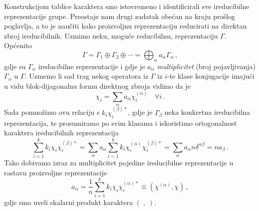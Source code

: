 Konstrukcijom tablice karaktera smo istovremeno i identificirali sve ireducibilne
reprezentacije grupe. Preostaje nam drugi zadatak obećan na kraju prošlog poglavlja,
a to je naučiti kako proizvoljnu reprezentaciju reducirati na direktan zbroj
ireducibilnih.  Uzmimo neku, moguće reducibilnu, reprezentaciju $\Gamma$. Općenito
\begin{displaymath}
  \Gamma = \Gamma_{1}\oplus\Gamma_{2}\oplus\cdots =
  \bigoplus_{\alpha} a_{\alpha} \Gamma_{\alpha} \,,
\end{displaymath}
gdje su $\Gamma_{\alpha}$ ireducibilne reprezentacije i
gdje je $a_{\alpha}$ \emph{multiplicitet} (broj pojavljivanja) 
$\Gamma_{\alpha}$ u $\Gamma$. 
Uzmemo li sad trag nekog operatora iz $\Gamma$ iz  $i$-te klase konjugacije
imajući u vidu blok-dijagonalnu formu direktnog zbroja vidimo da je
\begin{equation}
  \chi_i = \sum_{\alpha}  a_{\alpha} \chi^{(\alpha)}_i \quad 
  \forall i  \,.
\end{equation}
Sada pomnožimo ovu relaciju s $k_i \chi^{(\beta)*}_i$, gdje je $\Gamma_{\beta}$
neka konkretna ireducibilna reprezentacija, te prosumiramo po svim klasama
i iskoristimo ortogonalnost karaktera ireducibilnih reprezentacija
\begin{equation}
\sum_{i=1}^{k} k_i \chi_i \chi^{(\beta)*}_i =
\sum_{\alpha}  a_{\alpha} \sum_{i=1}^{k} k_i\chi^{(\alpha)}_i \chi^{(\beta)*}_i
=\sum_{\alpha}  a_{\alpha} n \delta^{\alpha \beta} = n a_{\beta} \,.
\end{equation}
Tako dobivamo izraz za multiplicitet pojedine ireducibilne reprezentacije u
rastavu proizvoljne reprezentacije
\begin{equation}
a_{\alpha} = \frac{1}{n} \sum_{i=1}^{k}  k_i \chi_i \chi^{(\alpha)*}_i
\equiv (\chi^{(\alpha)}, \chi) \,,
\label{eq:multiplicitet}
\end{equation}
gdje smo uveli skalarni produkt karaktera $(\;,\;)$.


